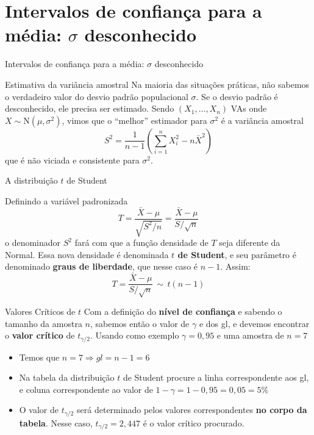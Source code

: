 \documentclass[14pt,aspectratio=1610]{beamer}
\begin{document}
\section{Intervalos de confiança para a média: $\sigma$ desconhecido}
\begin{frame}{Intervalos de confiança para a média: $\sigma$ desconhecido}
    \begin{block}{Estimativa da variância amostral}
    \justifying
Na maioria das situações práticas, não sabemos o verdadeiro valor do desvio padrão populacional $\sigma$. Se o desvio padrão é desconhecido, ele precisa ser estimado. Sendo $(X_1, \ldots, X_n)$ VAs onde $X \sim \text{N}(\mu, \sigma^2)$, vimos que o ``melhor'' estimador para $\sigma^2$ é a variância amostral
$$
S^2 = \frac{1}{n-1} (\sum_{i=1}^{n} X_i^2 - n\bar{X}^2)
$$   
que é não viciada e consistente para $\sigma^2$.   
\end{block}
\end{frame}

\begin{frame}{A distribuição $t$ de Student}
    \begin{block}{}
    \justifying
Definindo a variável padronizada
$$
T = \frac{\bar{X} - \mu}{\sqrt{S^2/n}} = \frac{\bar{X} - \mu}{S/\sqrt{n}}
$$   
o denominador $S^2$ fará com que a função densidade de $T$ seja diferente da Normal. Essa nova densidade é denominada \textbf{$t$ de Student}, e seu parâmetro é
denominado \textbf{graus de liberdade}, que nesse caso é $n-1$. Assim:
$$
T = \frac{\bar{X} - \mu}{S/\sqrt{n}} \, \sim \, t(n-1)
$$   
    \end{block}
\end{frame}

\begin{frame}{}
    \begin{block}{Valores Críticos de $t$}
    \justifying
Com a definição do \textbf{nível de confiança} e sabendo o tamanho da amostra $n$, sabemos então o valor de $\gamma$ e dos gl, e devemos encontrar o \textbf{valor crítico} de $t_{\gamma/2}$. Usando como exemplo $\gamma = 0,95$ e uma amostra de $n=7$

\begin{itemize}
    \item Temos que $n=7 \Rightarrow gl = n-1 = 6$

    \item Na tabela da distribuição $t$ de Student procure a linha correspondente aos gl, e  coluna correspondente ao valor de $1 - \gamma = 1 - 0,95 = 0,05 = 5\%$

    \item O valor de $t_{\gamma/2}$ será determinado pelos valores correspondentes \textbf{no corpo da tabela}. Nesse caso, $t_{\gamma/2} = 2,447$ é o valor crítico procurado.
\end{itemize}   
\end{block}
\end{frame}
\end{document}
